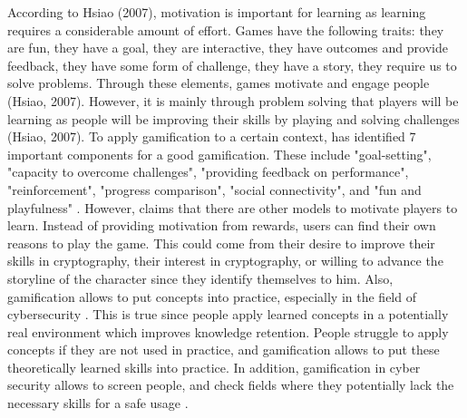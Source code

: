 \documentclass{l4proj}
\begin{document}
According to Hsiao (2007), motivation is important for learning as learning requires a considerable amount of effort. 
Games have the following traits: they are fun, they have a goal, they are interactive, they have outcomes and provide feedback, they have some form of challenge, 
they have a story, they require us to solve problems. Through these elements, games motivate and engage people (Hsiao, 2007). 
However, it is mainly through problem solving that players will be learning as people will be improving their skills by playing and solving challenges (Hsiao, 2007).
To apply gamification to a certain context, \citet{cugelman_gamification:_2013} has identified 7 important components for a good gamification. 
These include "goal-setting", "capacity to overcome challenges", "providing feedback on performance", "reinforcement", "progress comparison", "social connectivity", 
and "fun and playfulness" \citep{cugelman_gamification:_2013}. 
However, \citet{nicholson_recipe_2015} claims that there are other models to motivate players to learn. Instead of providing motivation from rewards, 
users can find their own reasons to play the game. This could come from their desire to improve their skills in cryptography, their interest in cryptography, or 
willing to advance the storyline of the character since they identify themselves to him.
Also, gamification allows to put concepts into practice, especially in the field of cybersecurity \citep{wolfenden_gamification_2019}. 
This is true since people apply learned concepts in a potentially real environment which improves knowledge retention. 
People struggle to apply concepts if they are not used in practice, and gamification allows to put these theoretically learned skills into practice.
In addition, gamification in cyber security allows to screen people,
and check fields where they potentially lack the necessary skills for a safe usage \citep{adams_cybersecurity_2015}.
\end{document}
